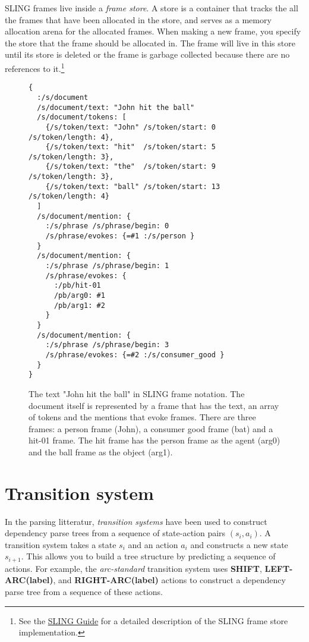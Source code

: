 \documentclass[11pt,a4paper]{article}
\begin{document}
SLING frames live inside a \emph{frame store}. A store is a container that
tracks the all the frames that have been allocated in the store, and serves as a
memory allocation arena for the allocated frames. When making a new frame, you
specify the store that the frame should be allocated in. The frame will live in
this store until its store is deleted or the frame is garbage collected because
there are no references to it.\footnote{See the \href{https://github.com/google/sling/blob/master/frame/README.md}{SLING Guide}
for a detailed description of the SLING frame store implementation.}

\begin{figure*}[t]
  \begin{verbatim}{
  :/s/document
  /s/document/text: "John hit the ball"
  /s/document/tokens: [
    {/s/token/text: "John" /s/token/start: 0  /s/token/length: 4},
    {/s/token/text: "hit"  /s/token/start: 5  /s/token/length: 3},
    {/s/token/text: "the"  /s/token/start: 9  /s/token/length: 3},
    {/s/token/text: "ball" /s/token/start: 13 /s/token/length: 4}
  ]
  /s/document/mention: {
    :/s/phrase /s/phrase/begin: 0
    /s/phrase/evokes: {=#1 :/s/person }
  }
  /s/document/mention: {
    :/s/phrase /s/phrase/begin: 1
    /s/phrase/evokes: {
      :/pb/hit-01
      /pb/arg0: #1
      /pb/arg1: #2
    }
  }
  /s/document/mention: {
    :/s/phrase /s/phrase/begin: 3
    /s/phrase/evokes: {=#2 :/s/consumer_good }
  }
}\end{verbatim}
  \caption{The text "John hit the ball" in SLING frame notation. The document
  itself is represented by a frame that has the text, an array of tokens and
  the mentions that evoke frames. There are three frames: a person frame (John),
  a consumer good frame (bat) and a hit-01 frame. The hit frame has the person
  frame as the agent (arg0) and the ball frame as the object (arg1).}
\end{figure*}

\section{Transition system}

In the parsing litteratur, \emph{transition systems} have been
used to construct dependency parse trees from a sequence of state-action pairs
$(s_i,a_i)$. A transition system takes a state $s_i$ and an action $a_i$ and
constructs a new state $s_{i+1}$. This allows you to build a tree structure by
predicting a sequence of actions. For example, the \emph{arc-standard}
transition system \cite{nivre2006} uses {\bf SHIFT}, {\bf LEFT-ARC(label)}, and
{\bf RIGHT-ARC(label)} actions to construct a dependency parse tree from a
sequence of these actions.
\end{document}
